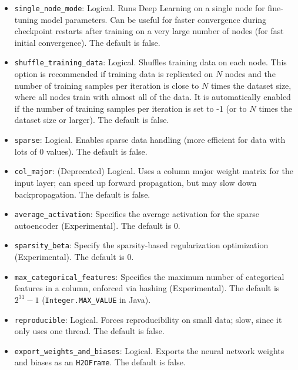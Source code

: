 {{\begin{itemize}
\item \texttt{single\_node\_mode}:  Logical. Runs Deep Learning on a single node for fine-tuning model parameters. Can be useful for faster convergence during checkpoint restarts after training on a very large number of nodes (for fast initial convergence). The default is false.

\item \texttt{shuffle\_training\_data}: Logical. Shuffles training data on each node. This option is recommended if training data is replicated on $N$ nodes and the number of training samples per iteration is close to $N$ times the dataset size, where all nodes train with almost all of the data. It is automatically enabled if the number of training samples per iteration is set to -1 (or to $N$ times the dataset size or larger).  The default is false.

\item \texttt{sparse}: Logical. Enables sparse data handling (more efficient for data with lots of 0 values).
The default is false.

\item \texttt{col\_major}: (Deprecated) Logical. Uses a column major weight matrix for the input layer; can speed up forward propagation, but may slow down backpropagation. The default is false.

\item \texttt{average\_activation}: Specifies the average activation for the sparse autoencoder (Experimental).
The default is 0.

\item \texttt{sparsity\_beta}: Specify the sparsity-based regularization optimization (Experimental).  The default is 0. 

\item \texttt{max\_categorical\_features}:  Specifies the maximum number of categorical features in a column, enforced via hashing (Experimental).  The default is $2^{31}-1$ (\texttt{Integer.MAX\_VALUE} in Java).

\item \texttt{reproducible}: Logical. Forces reproducibility on small data; slow, since it only uses one thread.  The default is false.

\item \texttt{export\_weights\_and\_biases}: Logical. Exports the neural network weights and biases as an \texttt{H2OFrame}.  The default is false.

%


\end{itemize}}}
